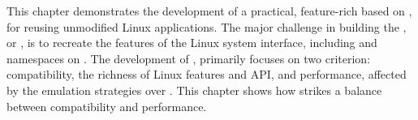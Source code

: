 This chapter
demonstrates the development of a practical, feature-rich \libos{} based on
\thehostabi{},
for reusing unmodified Linux applications.
The major challenge in building the \libos{},
or \thelibos{},
is to recreate the features of the Linux system interface, including
\linuxapis{} and namespaces on \thehostabi{}. %
The development of \thelibos{},
primarily focuses on two criterion:
compatibility, the richness of Linux features and API,
and performance, affected by
the emulation strategies over \thehostabi{}.
This chapter shows how \thelibos{} strikes a balance between compatibility and performance.




